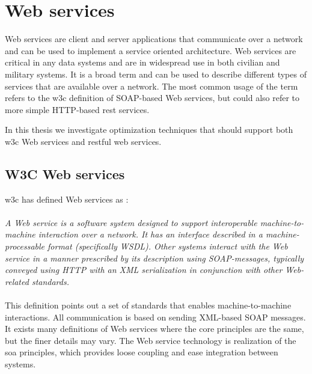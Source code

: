 \section{Web services}
\label{web-services}
Web services are client and server applications that communicate over a
network and can be used to implement a service oriented architecture. Web
services are critical in any data systems and are in widespread use in both
civilian and military systems. It is a broad term and can be used to describe
different types of services that are available over a network. The most common
usage of the term refers to the \gls{w3c} definition of SOAP-based Web
services, but could also refer to more simple HTTP-based \gls{rest} services.

In this thesis we investigate optimization techniques that should support both
\gls{w3c} Web services and \gls{rest}ful web services.

\subsection{W3C Web services}

\gls{w3c} has defined Web services as \cite{wrc-web-service}:

\paragraph{}
\textit{
    A Web service is a software system designed to support interoperable
    machine-to-machine interaction over a network. It has an interface described in
    a machine-processable format (specifically WSDL). Other systems interact with
    the Web service in a manner prescribed by its description using SOAP-messages,
    typically conveyed using HTTP with an XML serialization in conjunction with
    other Web-related standards.
}

\paragraph{}

This definition points out a set of standards that enables machine-to-machine
interactions. All communication is based on sending XML-based SOAP messages. It
exists many definitions of Web services where the core principles are the same,
but the finer details may vary. The Web service technology is realization of the
\gls{soa} principles, which provides loose coupling and ease integration between
systems.

